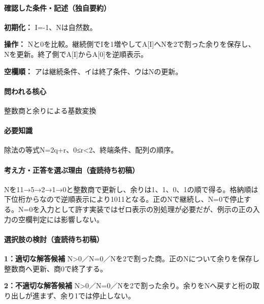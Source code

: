 \paragraph{確認した条件・記述（独自要約）}\mbox{}\par

\noindent\textbf{初期化：} I=-1、Nは自然数。\par

\noindent\textbf{操作：} Nと0を比較。継続側でIを1増やしてA[I]へNを2で割った余りを保存し、Nを更新。終了側でA[I]からA[0]を逆順表示。\par

\noindent\textbf{空欄順：} アは継続条件、イは終了条件、ウはNの更新。\par

\paragraph{問われる核心} 整数商と余りによる基数変換

\paragraph{必要知識} 除法の等式N=\allowbreak{}2q+r、0≤r<2、終端条件、配列の順序。

\paragraph{考え方・正答を選ぶ理由（査読待ち初稿）} Nを11→5→2→1→0と整数商で更新し、余りは1、1、0、1の順で得る。格納順は下位桁からなので逆順表示により1011となる。正のNで継続し、N=\allowbreak{}0で停止する。N=\allowbreak{}0を入力として許す実装ではゼロ表示の別処理が必要だが、例示の正の入力の空欄判定には影響しない。

\paragraph{選択肢の検討（査読待ち初稿）}\mbox{}\par

\noindent\textbf{1：適切な解答候補} N>0／N=\allowbreak{}0／Nを2で割った商。正のNについて余りを保存し整数商へ更新、商0で終了する。\par

\noindent\textbf{2：不適切な解答候補} N>0／N=\allowbreak{}0／Nを2で割った余り。余りをNへ戻すと桁の取り出しが進まず、余り1では停止しない。\par

